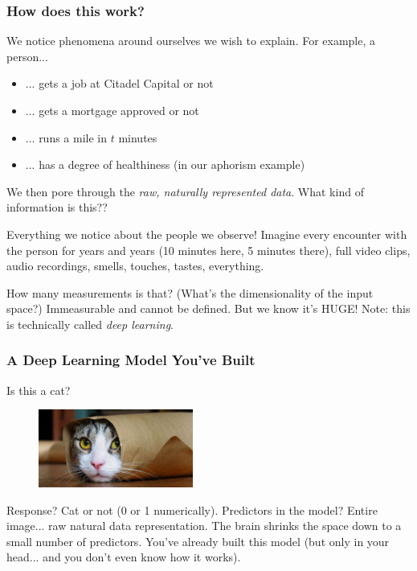 \documentclass[handout]{beamer}
\begin{document}
\begin{frame}\frametitle{How does this work?}
\small
We notice phenomena around ourselves we wish to explain. For example, a person...

\begin{itemize}
\item ... gets a job at Citadel Capital or not \pause 
\item ... gets a mortgage approved or not \pause 
\item ... runs a mile in $t$ minutes \pause 
\item ... has a degree of healthiness (in our aphorism example)
\end{itemize}

We then pore through the \textit{raw, naturally represented data}. What kind of information is this??\pause 

Everything we notice about the people we observe! Imagine every encounter with the person for years and years (10 minutes here, 5 minutes there), full video clips, audio recordings, smells, touches, tastes, everything. \pause 

How many measurements is that? (What's the dimensionality of the input space?) Immeasurable and cannot be defined. But we know it's HUGE! Note: this is technically called \emph{deep learning}.

\end{frame}


\begin{frame}\frametitle{A Deep Learning Model You've Built}

Is this a cat?

\begin{figure}
\centering
\includegraphics[width=2in]{cat.jpg}
\end{figure}


Response?  \pause Cat or not (0 or 1 numerically). Predictors in the model?  \pause Entire image... raw natural data representation.  \pause The brain shrinks the space down to a small number of predictors. You've already built this model (but only in your head... and you don't even know how it works). 

	
\end{frame}
\end{document}
